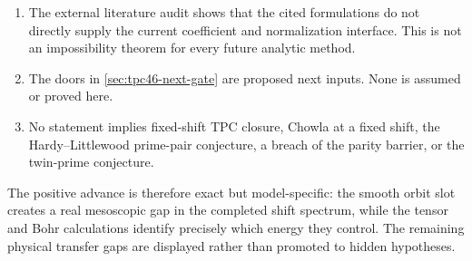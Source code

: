\begin{enumerate}[label=\textup{\arabic*.},leftmargin=2.2em]
 argument.  The inherited projective theorem is not asserted uniformly
 for a growing set of shifts.
 \item The external literature audit shows that the cited formulations
 do not directly supply the current coefficient and normalization
 interface.  This is not an impossibility theorem for every future
 analytic method.
 \item The doors in \cref{sec:tpc46-next-gate} are proposed next
 inputs.  None is assumed or proved here.
 \item No statement implies fixed-shift TPC closure, Chowla at a fixed
 shift, the Hardy--Littlewood prime-pair conjecture, a breach of the
 parity barrier, or the twin-prime conjecture.
\end{enumerate}

The positive advance is therefore exact but model-specific: the smooth
orbit slot creates a real mesoscopic gap in the completed shift
spectrum, while the tensor and Bohr calculations identify precisely
which energy they control.  The remaining physical transfer gaps are
displayed rather than promoted to hidden hypotheses.
